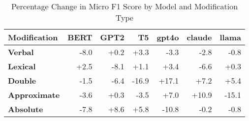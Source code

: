 \begin{table}[h]
\centering
\begin{tabular}{lrrrrrr}
\hline
Modification & \textbf{BERT} & \textbf{GPT2} & \textbf{T5} & \textbf{gpt4o} & \textbf{claude} & \textbf{llama} \\
\hline
\textbf{Verbal} & \cellcolor{red!24} -8.0 & \cellcolor{green!0} +0.2 & \cellcolor{green!9} +3.3 & \cellcolor{red!9} -3.3 & \cellcolor{red!8} -2.8 & \cellcolor{red!2} -0.8 \\
\hline
\textbf{Lexical} & \cellcolor{green!7} +2.5 & \cellcolor{red!24} -8.1 & \cellcolor{green!3} +1.1 & \cellcolor{green!10} +3.4 & \cellcolor{red!19} -6.6 & \cellcolor{green!0} +0.3 \\
\hline
\textbf{Double} & \cellcolor{red!4} -1.5 & \cellcolor{red!19} -6.4 & \cellcolor{red!30} -16.9 & \cellcolor{green!30} +17.1 & \cellcolor{green!21} +7.2 & \cellcolor{green!16} +5.4 \\
\hline
\textbf{Approximate} & \cellcolor{red!10} -3.6 & \cellcolor{green!0} +0.3 & \cellcolor{red!10} -3.5 & \cellcolor{green!20} +7.0 & \cellcolor{green!30} +10.9 & \cellcolor{red!30} -15.1 \\
\textbf{Absolute} & \cellcolor{red!23} -7.8 & \cellcolor{green!25} +8.6 & \cellcolor{green!17} +5.8 & \cellcolor{red!30} -10.8 & \cellcolor{red!0} -0.2 & \cellcolor{red!2} -0.8 \\
\hline
\end{tabular}
\caption{Percentage Change in Micro F1 Score by Model and Modification Type}
\label{tab:ner_results}
\end{table}